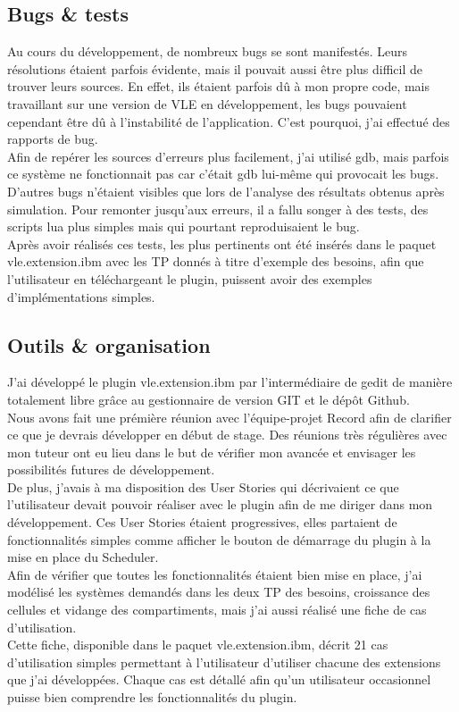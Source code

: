 \subsection{Bugs \& tests}
Au cours du développement, de nombreux bugs se sont manifestés. Leurs résolutions étaient parfois évidente, mais il pouvait aussi être plus difficil de trouver leurs sources. En effet, ils étaient parfois dû à mon propre code, mais travaillant sur une version de VLE en développement, les bugs pouvaient cependant être dû à l'instabilité de l'application. C'est pourquoi, j'ai effectué des rapports de bug.\\

Afin de repérer les sources d'erreurs plus facilement, j'ai utilisé gdb, mais parfois ce système ne fonctionnait pas car c'était gdb lui-même qui provocait les bugs.\\
D'autres bugs n'étaient visibles que lors de l'analyse des résultats obtenus après simulation. Pour remonter jusqu'aux erreurs, il a fallu songer à des tests, des scripts lua plus simples mais qui pourtant reproduisaient le bug.\\
Après avoir réalisés ces tests, les plus pertinents ont été insérés dans le paquet vle.extension.ibm avec les TP donnés à titre d'exemple des besoins, afin que l'utilisateur en téléchargeant le plugin, puissent avoir des exemples d'implémentations simples.

\subsection{Outils \& organisation}
J'ai développé le plugin vle.extension.ibm par l'intermédiaire de gedit de manière totalement libre grâce au gestionnaire de version GIT et le dépôt Github.\\
Nous avons fait une prémière réunion avec l'équipe-projet Record afin de clarifier ce que je devrais développer en début de stage. Des réunions très régulières avec mon tuteur ont eu lieu dans le but de vérifier mon avancée et envisager les possibilités futures de développement.\\
De plus, j'avais à ma disposition des User Stories qui décrivaient ce que l'utilisateur devait pouvoir réaliser avec le plugin afin de me diriger dans mon développement. Ces User Stories étaient progressives, elles partaient de fonctionnalités simples comme afficher le bouton de démarrage du plugin à la mise en place du Scheduler.\\
Afin de vérifier que toutes les fonctionnalités étaient bien mise en place, j'ai modélisé les systèmes demandés dans les deux TP des besoins, croissance des cellules et vidange des compartiments, mais j'ai aussi réalisé une fiche de cas d'utilisation.\\
Cette fiche, disponible dans le paquet vle.extension.ibm, décrit 21 cas d'utilisation simples permettant à l'utilisateur d'utiliser chacune des extensions que j'ai développées. Chaque cas est détallé afin qu'un utilisateur occasionnel puisse bien comprendre les fonctionnalités du plugin.

